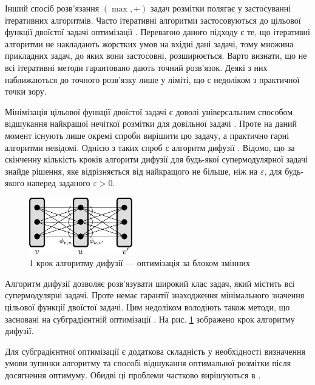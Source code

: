 Інший спосіб розв'язання \((\max,+)\) задач розмітки полягає у застосуванні
ітеративних алгоритмів. Часто ітеративні алгоритми застосовуються до цільової функції
двоїстої задачі оптимізації \cite{SchlGig_1_usim2007,diffusion_shlezinger}. Перевагою даного підходу є те, що ітеративні алгоритми
не накладають жорстких умов на вхідні дані задачі, тому
множина прикладних задач, до яких вони застосовні, розширюється.
Варто визнати, що не всі ітеративні
методи гарантовано дають точний розв'язок.
Деякі з них наближаються до точного розв'язку лише у ліміті,
що є недоліком з практичної точки зору.

Мінімізація цільової функції двоїстої задачі є доволі універсальним способом відшукання найкращої
нечіткої розмітки для довільної задачі \cite{diffusion_shlezinger,savchynskyy,SchlGig_1_usim2007}. Проте на даний момент існують лише окремі спроби вирішити цю задачу,
а практично гарні алгоритми невідомі.
Однією з таких спроб є алгоритм дифузії \cite{diffusion_shlezinger, savchynskyy}.
Відомо, що за скінченну кількість кроків алгоритм дифузії для будь-якої супермодулярної задачі
знайде рішення, яке відрізняється від найкращого не більше, ніж на $\varepsilon$,
для будь-якого наперед заданого $\varepsilon>0$.

\begin{figure}[h]
  \centering
  \includegraphics[width=0.4\textwidth]{images/One-elementary-step-of_diffusion.png}
  \caption{1 крок алгоритму дифузії --- оптимізація за блоком змінних \cite{ishikawa}}
  \label{fig:graph_example_diffusion}
\end{figure}

Алгоритм дифузії дозволяє розв'язувати широкий клас задач, який містить всі
супермодулярні задачі.
Проте немає гарантії знаходження мінімального
значення цільової функції двоїстої задачі. Цим недоліком володіють також
методи, що засновані на субградієнтній оптимізації \cite{Shor1985}.
На рис. \ref{fig:graph_example_diffusion} зображено крок алгоритму дифузії.

Для субградієнтної оптимізації є додаткова складність у необхідності визначення
умови зупинки алгоритму та способі відшукання оптимальної розмітки
після досягнення оптимуму. Обидві ці проблеми частково вирішуються в \cite{lopatka_stop_cond}.

